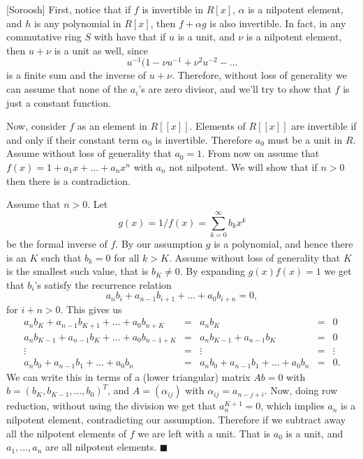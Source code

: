 \documentclass{article}
\makeatletter
\newcommand\<{\triangleleft}
\newenvironment{solution}[1]{\def\x{#1}\begin{trivlist}\item[]\hspace*{-.5em}[\x]}
                {\hspace*{\fill} $\blacksquare$
                \protected@write0{}{\currentEx, \x}
                \end{trivlist}}
\makeatother
\begin{document}
 \begin{solution}{Soroosh}
    First, notice that if $f$ is invertible in $R[x]$, $\alpha$ is a nilpotent
    element, and $h$ is any polynomial in $R[x]$, then $f+\alpha g$ is also
    invertible. In fact, in any commutative ring $S$ with have that if $u$ is
    a unit, and $\nu$ is a nilpotent element, then $u+\nu$ is a unit as well,
    since \[u^{-1}(1-\nu u^{-1}+\nu^2 u^{-2}-\dots \]
    is a finite sum and the inverse of $u+\nu$. Therefore, without loss of
    generality we can assume that none of the $a_i$'s are zero divisor,
    and we'll try to show that $f$ is just a constant function.

    Now, consider $f$ as an element in $R[[x]]$. Elements of $R[[x]]$ are
    invertible if and only if their constant term $\alpha_0$ is
    invertible. Therefore $a_0$ must be a unit in $R$. Assume without
    loss of generality that $a_0=1$.
    From now on assume that $f(x)=1+a_1x+\dots+a_nx^n$ with $a_n$ not
    nilpotent. We will show that if $n>0$ then there is a contradiction.

    Assume that $n > 0$.
    Let \[g(x)=1/f(x)=\sum_{k=0}^\infty b_kx^k \] be the formal
    inverse of $f$. By our assumption $g$ is a polynomial, and
    hence there is an $K$ such that $b_k=0$ for all $k>K$. Assume
    without loss of generality that $K$ is the smallest such value,
    that is $b_K \neq 0$.
    By expanding $g(x)f(x)=1$ we get that  $b_i$'s satisfy
    the recurrence relation
    \[ a_n b_i+a_{n-1}b_{i+1}+...+a_0 b_{i+n}=0, \]
    for $i+n>0$.
    This gives us
    \[\begin{array}{ccccc
    }
        a_n b_{K}+a_{n-1}b_{K+1}+\dots+a_0 b_{n+K}&=& a_n b_K &=&  0 \\
        a_n b_{K-1}+a_{n-1}b_{K}+\dots+a_0 b_{n-1+K}&=& a_n b_{K-1}+a_{n-1}b_K &=&  0 \\
        \vdots &=& \vdots &=& \vdots \\
        a_n b_{0}+a_{n-1}b_{1}+\dots+a_0 b_{n}&=& a_n b_0+a_{n-1}b_1+\dots+a_0b_n &=&  0.
    \end{array}\]
    We can write this in terms of a (lower triangular) matrix $A b = 0$ with
    $b=(b_K, b_{K-1}, \dots, b_0)^T$, and $A=(\alpha_{ij})$ with
    $\alpha_{ij}=a_{n-j+i}$. Now, doing row reduction, without using the
    division we get that $a_n^{K+1}=0$, which implies $a_n$ is a nilpotent element,
    contradicting our assumption. Therefore if we subtract away all the nilpotent
    elements of $f$ we are left with a unit. That is
    $a_0$ is a unit, and $a_1,\dots,a_n$ are all nilpotent elements.
 \end{solution}
\end{document}
